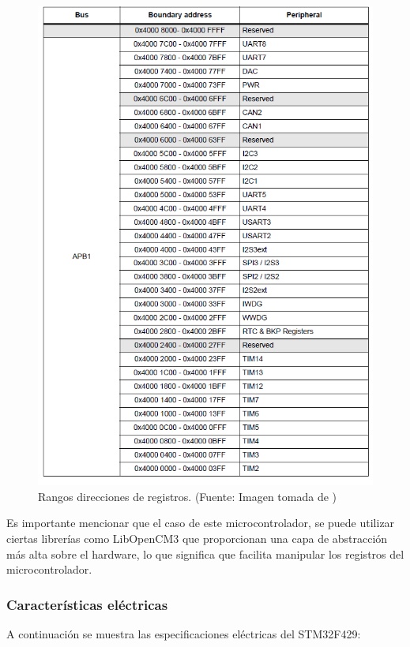 \begin{figure}[H]
\centering
\includegraphics[scale=0.8]{./Figuras/Nota_teorica/REGS3}
\caption{Rangos direcciones de registros. (Fuente: Imagen tomada de \cite{ST})}
\label{fig:REGS3}
\end{figure}

Es importante mencionar que el caso de este microcontrolador, se puede utilizar ciertas librerías como LibOpenCM3 que proporcionan una capa de abstracción más alta sobre el hardware, lo que significa que facilita manipular los registros del microcontrolador.

\subsubsection{Características eléctricas}
A continuación se muestra las especificaciones eléctricas del STM32F429:

